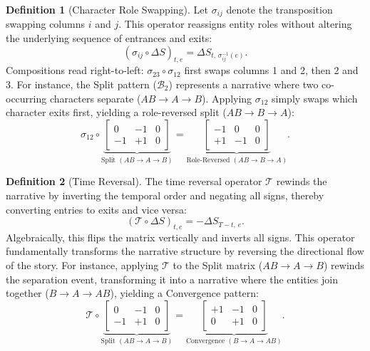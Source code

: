 \documentclass[sigconf,review,anonymous]{acmart}
\theoremstyle{definition}
\newtheorem{definition}{Definition}[section]
\newcommand{\calB}{\mathcal{B}}
\newcommand{\calT}{\mathcal{T}}
\begin{document}
\begin{definition}[Character Role Swapping]
\label{def:col_perm}
Let $\sigma_{ij}$ denote the transposition swapping columns $i$ and $j$. This operator reassigns entity roles without altering the underlying sequence of entrances and exits:
\begin{equation}
(\sigma_{ij} \circ \Delta S)_{t,e} = \Delta S_{t,\,\sigma_{ij}^{-1}(e)}.
\label{eq:col_perm}
\end{equation}
Compositions read right-to-left: $\sigma_{23} \circ \sigma_{12}$ first swaps columns 1 and 2, then 2 and 3. For instance, the Split pattern ($\calB_2$) represents a narrative where two co-occurring characters separate ($AB \rightarrow A \rightarrow B$). Applying $\sigma_{12}$ simply swaps which character exits first, yielding a role-reversed split ($AB \rightarrow B \rightarrow A$):
\begin{equation*}
\sigma_{12} \circ \underbrace{\begin{bmatrix} 0 & -1 & 0 \\ -1 & +1 & 0 \end{bmatrix}}_{\text{Split } (AB \rightarrow A \rightarrow B)} = \underbrace{\begin{bmatrix} -1 & 0 & 0 \\ +1 & -1 & 0 \end{bmatrix}}_{\text{Role-Reversed } (AB \rightarrow B \rightarrow A)}.
\end{equation*}
\end{definition}

\begin{definition}[Time Reversal]
\label{def:time_rev}
The time reversal operator $\calT$ rewinds the narrative by inverting the temporal order and negating all signs, thereby converting entries to exits and vice versa:
\begin{equation}
(\calT \circ \Delta S)_{t,e} = -\Delta S_{T-t,\,e}.
\label{eq:time_rev}
\end{equation}
Algebraically, this flips the matrix vertically and inverts all signs. This operator fundamentally transforms the narrative structure by reversing the directional flow of the story. For instance, applying $\calT$ to the Split matrix ($AB \rightarrow A \rightarrow B$) rewinds the separation event, transforming it into a narrative where the entities join together ($B \rightarrow A \rightarrow AB$), yielding a Convergence pattern:
\begin{equation*}
\calT \circ \underbrace{\begin{bmatrix} 0 & -1 & 0 \\ -1 & +1 & 0 \end{bmatrix}}_{\text{Split } (AB \rightarrow A \rightarrow B)} = \underbrace{\begin{bmatrix} +1 & -1 & 0 \\ 0 & +1 & 0 \end{bmatrix}}_{\text{Convergence } (B \rightarrow A \rightarrow AB)}.
\end{equation*}
\end{definition}
\end{document}
